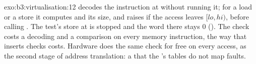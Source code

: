 \begin{solution}{exo:b3:virtualisation:12}
 decodes the instruction at  without running it; for a load or a store it computes  and its size, and raises  if the access leaves $[\mathit{lo}, \mathit{hi})$, before calling . The test's store at  is stopped and the word there stays 0 (). The check costs a decoding and a comparison on every memory instruction, the way  that inserts checks costs. Hardware does the same check for free on every access, as the second stage of address translation: a   that the 's tables do not map faults.
\end{solution}


